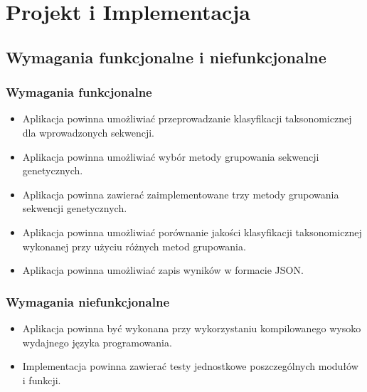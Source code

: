 \cleardoublepage
\section{Projekt i Implementacja}


    \subsection{Wymagania funkcjonalne i niefunkcjonalne}

        \subsubsection{Wymagania funkcjonalne}

            \begin{itemize}
                \item Aplikacja powinna umożliwiać przeprowadzanie klasyfikacji taksonomicznej dla wprowadzonych sekwencji.
                \item Aplikacja powinna umożliwiać wybór metody grupowania sekwencji genetycznych.
                \item Aplikacja powinna zawierać zaimplementowane trzy metody grupowania sekwencji genetycznych.
                \item Aplikacja powinna umożliwiać porównanie jakości klasyfikacji taksonomicznej wykonanej przy użyciu różnych metod grupowania.
                \item Aplikacja powinna umożliwiać zapis wyników w formacie JSON.
            \end{itemize}

        \subsubsection{Wymagania niefunkcjonalne}

            \begin{itemize}
                \item Aplikacja powinna być wykonana przy wykorzystaniu kompilowanego wysoko wydajnego języka programowania.
                \item Implementacja powinna zawierać testy jednostkowe poszczególnych modułów i funkcji.
            \end{itemize}

